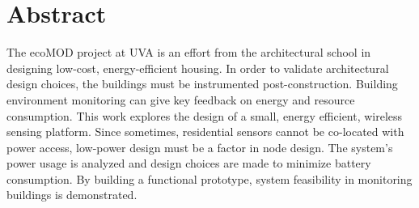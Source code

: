 \chapter{Abstract}

The ecoMOD project at UVA is an effort from the architectural school in designing low-cost, energy-efficient housing. In order to validate architectural design choices, the buildings must be instrumented post-construction. Building environment monitoring can give key feedback on energy and resource consumption. This work explores the design of a small, energy efficient, wireless sensing platform. Since sometimes, residential sensors cannot be co-located with power access, low-power design must be a factor in node design. The system's power usage is analyzed and design choices are made to minimize battery consumption. By building a functional prototype, system feasibility in monitoring buildings is demonstrated.

\listoftodos